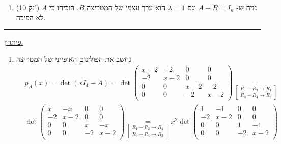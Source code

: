\documentclass[12pt, a4paper]{article}
\newcommand{\points}[1]{(#1 נק') }
\begin{document}
\begin{enumerate}
{\begin{enumerate}
        הראו כי אם הוקטורים
        $v_1,v_2,v_3$ בלתי תלויים לינארית (בת"ל) ואם המטריצה $A$ היא הפיכה,
        
        אז
        הוקטורים
        $Av_1,Av_2,Av_3$
        הם בלתי תלויים לינארית.

        \ 
        
        \item\points{10} 
        נניח ש-
        $A+B = I_n$ וגם
        $\lambda=1$
        הוא ערך עצמי של המטריצה
        $B$.
        הוכיחו כי $A$ לא הפיכה.
    \end{enumerate}
}\forthQ
\pagebreak
\setcounter{enumi}{0}
    \firstQ
\noindent\rule{\textwidth-30pt}{0.4pt}
\underline{פיתרון:}
\begin{enumerate}
    \item 
    נחשב את הפולינום האופייני של המטריצה
    \begin{align*}
        &p_A(x)=\det(xI_4-A)=
        \det\begin{pmatrix}
            x-2&-2&0&0\\
            -2&x-2&0&0\\
            0&0&x-2&-2\\
            0&0&-2&x-2\\
        \end{pmatrix}
        \underset{\begin{bmatrix}
        R_1-R_2\rightarrow R_1\\
        R_3-R_4\rightarrow R_3
        \end{bmatrix}}{=}
        \\&
        \det\begin{pmatrix}
            x&-x&0&0\\
            -2&x-2&0&0\\
            0&0&x&-x\\
            0&0&-2&x-2\\
        \end{pmatrix}
        \underset{\begin{bmatrix}
        R_1-R_2\rightarrow R_1\\
        R_3-R_4\rightarrow R_3
        \end{bmatrix}}{=}x^2   
          \det\begin{pmatrix}
            1&-1&0&0\\
            -2&x-2&0&0\\
            0&0&1&-1\\
            0&0&-2&x-2\\

\end{pmatrix}
\end{align*}
\end{enumerate}
\end{enumerate}
\end{document}

